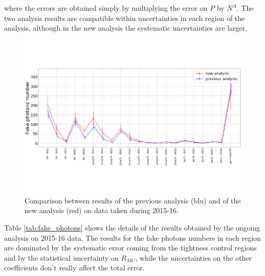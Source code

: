 \documentclass[11pt,a4paper,twoside,openright]{book}
\begin{document}
where the errors are obtained simply by multiplying the error on $P$ by $N^{A}$. The two analysis results are compatible within uncertainties in each region of the analysis, although in the new analysis the systematic uncertainties are larger.

\begin{figure}[hbtp!]
    \centering
    \includegraphics[width=12cm]{analysis_comparison.pdf}
    \caption{Comparison between results of the previous analysis (blu) and of the new analysis (red) on data taken during 2015-16.}
    \label{fig:analysis_comparison}
\end{figure}

Table \ref{tab:fake_photons} shows the details of the results obtained by the ongoing analysis on 2015-16 data. The results for the fake photons numbers in each region are dominated by the systematic error coming from the tightness control regions and by the statistical uncertainty on $R_{MC}$, while the uncertainties on the other coefficients don't really affect the total error.
\end{document}
